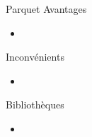 \begin{frame}{Parquet}
  Avantages

  \begin{itemize}
    \item 
  \end{itemize}

  Inconvénients

  \begin{itemize}
    \item 
  \end{itemize}

  Bibliothèques

  \begin{itemize}
    \item 
  \end{itemize}
\end{frame}